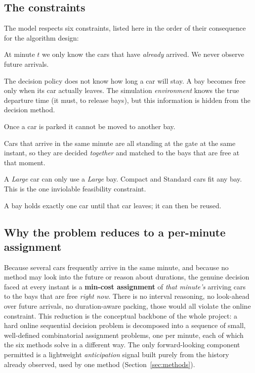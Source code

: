 \documentclass[11pt,a4paper]{article}
\begin{document}
\subsection{The constraints}

The model respects six constraints, listed here in the order of their consequence for
the algorithm design:

\begin{description}[leftmargin=1.4em,style=nextline]
  \item[Online.] At minute $t$ we only know the cars that have \emph{already} arrived.
        We never observe future arrivals.
  \item[Unknown duration.] The decision policy does not know how long a car will stay.
        A bay becomes free only when its car actually leaves. The simulation
        \emph{environment} knows the true departure time (it must, to release bays), but
        this information is hidden from the decision method.
  \item[Irrevocable.] Once a car is parked it cannot be moved to another bay.
  \item[Simultaneity.] Cars that arrive in the same minute are all standing at the gate
        at the same instant, so they are decided \emph{together} and matched to the bays
        that are free at that moment.
  \item[Size rule (hard).] A \emph{Large} car can only use a \emph{Large} bay. Compact
        and Standard cars fit any bay. This is the one inviolable feasibility constraint.
  \item[One car per bay.] A bay holds exactly one car until that car leaves; it can then
        be reused.
\end{description}

\subsection{Why the problem reduces to a per-minute assignment}

Because several cars frequently arrive in the same minute, and because no method may
look into the future or reason about durations, the genuine decision faced at every
instant is a \textbf{min-cost assignment} of \emph{that minute's} arriving cars to the
bays that are free \emph{right now}. There is no interval reasoning, no look-ahead over
future arrivals, no duration-aware packing, those would all violate the online
constraint. This reduction is the conceptual backbone of the whole project: a hard
online sequential decision problem is decomposed into a sequence of small, well-defined
combinatorial assignment problems, one per minute, each of which the six methods solve
in a different way. The only forward-looking component permitted is a lightweight
\emph{anticipation} signal built purely from the history already observed, used by one
method (Section~\ref{sec:methods}).
\end{document}
